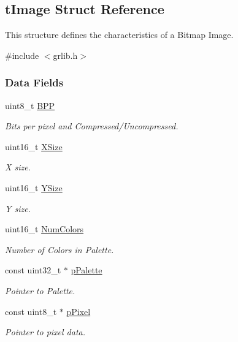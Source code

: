 \subsection{t\+Image Struct Reference}
\label{structt_image}


This structure defines the characteristics of a Bitmap Image.  




{\ttfamily \#include $<$grlib.\+h$>$}

\subsubsection*{Data Fields}
\begin{DoxyCompactItemize}
\item 
uint8\+\_\+t \hyperlink{structt_image_a14fdec54a22919a1dd01696d822d7bc1}{B\+P\+P}
\begin{DoxyCompactList}\small\item\em Bits per pixel and Compressed/\+Uncompressed. \end{DoxyCompactList}\item 
uint16\+\_\+t \hyperlink{structt_image_a75c4236e788d7b87125fe4ac9c2c093f}{X\+Size}
\begin{DoxyCompactList}\small\item\em X size. \end{DoxyCompactList}\item 
uint16\+\_\+t \hyperlink{structt_image_aabec4fd2b1674b99883cde5f05f8adff}{Y\+Size}
\begin{DoxyCompactList}\small\item\em Y size. \end{DoxyCompactList}\item 
uint16\+\_\+t \hyperlink{structt_image_a7cfdcf29e774c99da8ed4cd412369033}{Num\+Colors}
\begin{DoxyCompactList}\small\item\em Number of Colors in Palette. \end{DoxyCompactList}\item 
const uint32\+\_\+t $\ast$ \hyperlink{structt_image_a931e08ce83a6fdeb70e841048bd6c2fc}{p\+Palette}
\begin{DoxyCompactList}\small\item\em Pointer to Palette. \end{DoxyCompactList}\item 
const uint8\+\_\+t $\ast$ \hyperlink{structt_image_a0bccc8fd4af99087b851cc3aa74e8307}{p\+Pixel}
\begin{DoxyCompactList}\small\item\em Pointer to pixel data. \end{DoxyCompactList}\end{DoxyCompactItemize}


